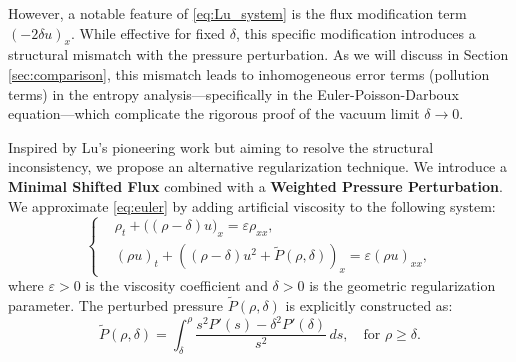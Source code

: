 \documentclass[12pt, reqno]{article}
\theoremstyle{definition}
\newcommand{\eps}{\varepsilon}
\numberwithin{equation}{section}
\begin{document}
However, a notable feature of \eqref{eq:Lu_system} is the flux modification term $(-2\delta u)_x$. While effective for fixed $\delta$, this specific modification introduces a structural mismatch with the pressure perturbation. As we will discuss in Section \ref{sec:comparison}, this mismatch leads to inhomogeneous error terms (pollution terms) in the entropy analysis—specifically in the Euler-Poisson-Darboux equation—which complicate the rigorous proof of the vacuum limit $\delta \to 0$.

Inspired by Lu's pioneering work but aiming to resolve the structural inconsistency, we propose an alternative regularization technique. We introduce a \textbf{Minimal Shifted Flux} combined with a \textbf{Weighted Pressure Perturbation}.
We approximate \eqref{eq:euler} by adding artificial viscosity to the following system:
\begin{equation} \label{eq:perturbed_system}
\left\{
\begin{aligned}
    & \rho_t + \big( (\rho - \delta) u \big)_x = \eps \rho_{xx}, \\
    & (\rho u)_t + ((\rho-\delta)u^2+ \tilde{P}(\rho, \delta))_x = \eps (\rho u)_{xx},
\end{aligned}
\right.
\end{equation}
where $\eps > 0$ is the viscosity coefficient and $\delta > 0$ is the geometric regularization parameter. The perturbed pressure $\tilde{P}(\rho, \delta)$ is explicitly constructed as:
\begin{equation} \label{eq:P_tilde_def}
\tilde{P}(\rho, \delta) = \int_{\delta}^{\rho} \frac{s^2P'(s) - \delta^2 P'(\delta)}{s^2} \, ds, \quad \text{for } \rho \ge \delta.
\end{equation}
\end{document}
